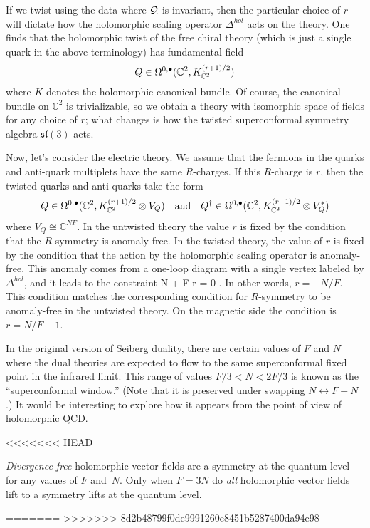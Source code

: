 \documentclass[11pt]{amsart}
\def\C{{\mathbb{C}}}
\def\lie#1{\ensuremath{\mathfrak{#1}}}
\begin{document}
If we twist using the data where $\mathcal Q$ is invariant, then the particular choice of $r$ will dictate how the holomorphic scaling operator $\Delta^{hol}$ acts on the theory.
One finds that the holomorphic twist of the free chiral theory (which is just a single quark in the above terminology) has fundamental field
\[
Q \in \Omega^{0,\bullet}(\mathbb C^2 , K_{\mathbb C^2}^{(r+1)/2}) 
\] 
where $K$ denotes the holomorphic canonical bundle.
Of course, the canonical bundle on $\C^2$ is trivializable, so we obtain a theory with isomorphic space of fields for any choice of $r$; what changes is how the twisted superconformal symmetry algebra $\lie{sl}(3)$ acts.  


Now, let's consider the electric theory.
We assume that the fermions in the quarks and anti-quark multiplets have the same $R$-charges.
If this $R$-charge is $r$, then the twisted quarks and anti-quarks take the form
\[
Q \in \Omega^{0,\bullet}(\mathbb C^2 , K_{\mathbb C^2}^{(r+1)/2} \otimes V_Q) \quad\text{and}\quad Q^\dagger \in \Omega^{0,\bullet}(\mathbb C^2 , K_{\mathbb C^2}^{(r+1)/2} \otimes V_Q^*)
\]
where $V_Q \cong \C^{NF}$.
In the untwisted theory the value $r$ is fixed by the condition that the $R$-symmetry is anomaly-free.
In the twisted theory, the value of $r$ is fixed by the condition that the action by the holomorphic scaling operator is anomaly-free.
This anomaly comes from a one-loop diagram with a single vertex labeled by $\Delta^{hol}$, and it leads to the constraint 
\beqn
N + F r = 0 .
\eeqn
In other words, $r = - N / F$. 
This condition matches the corresponding condition for $R$-symmetry to be anomaly-free in the untwisted theory. 
On the magnetic side the condition is $r = N/F - 1$.

In the original version of Seiberg duality, there are certain values of $F$ and $N$ where the dual theories are expected to flow to the same superconformal fixed point in the infrared limit. 
This range of values $F/3 < N < 2F/3$ is known as the ``superconformal window.''
(Note that it is preserved under swapping $N \leftrightarrow F-N$.)
It would be interesting to explore how it appears from the point of view of holomorphic QCD. 

<<<<<<< HEAD
\begin{cor}
{\em Divergence-free} holomorphic vector fields are a symmetry at the quantum level for any values of $F$ and~$N$.
Only when $F = 3N$ do {\em all} holomorphic vector fields lift to a symmetry lifts at the quantum level.
\end{cor}
=======
>>>>>>> 8d2b48799f0de9991260e8451b5287400da94e98
\end{document}
